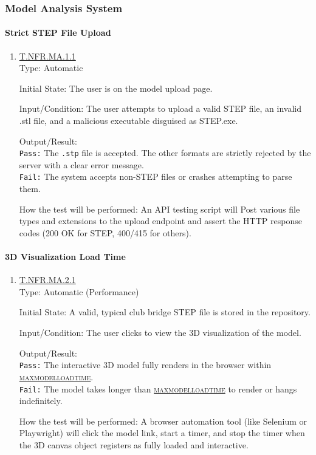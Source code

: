 \documentclass[12pt, titlepage]{article}
\newcommand{\testdef}[1]{\leavevmode\hypertarget{test:#1}{}\hyperlink{trace:#1}{#1}}
\DeclareRobustCommand{\cname}[1]{{\renewcommand{\_}{\textunderscore\allowbreak}\textsc{#1}}}
\newcommand{\constfirst}[1]{\leavevmode\hypertarget{constfirst:\detokenize{#1}}{}\hyperlink{const:\detokenize{#1}}{\cname{#1}}}
\newcommand{\const}[1]{\hyperlink{const:\detokenize{#1}}{\cname{#1}}}
\begin{document}
\subsubsection{Model Analysis System}

\paragraph{Strict STEP File Upload}
\begin{enumerate}
  \item \testdef{T.NFR.MA.1.1}\\
  Type: Automatic

  Initial State: The user is on the model upload page.

  Input/Condition: The user attempts to upload a valid STEP file, an invalid .stl file, and a malicious executable disguised as STEP.exe.

  Output/Result: \\
  \texttt{Pass:} The \texttt{.stp} file is accepted. The other formats are strictly rejected by the server with a clear error message.\\
  \texttt{Fail:} The system accepts non-STEP files or crashes attempting to parse them.

  How the test will be performed: An API testing script will Post various file types and extensions to the upload endpoint and assert the HTTP response codes (200 OK for STEP, 400/415 for others).
\end{enumerate}

\paragraph{3D Visualization Load Time}
\begin{enumerate}
  \item \testdef{T.NFR.MA.2.1}\\
  Type: Automatic (Performance)

  Initial State: A valid, typical club bridge STEP file is stored in the repository.

  Input/Condition: The user clicks to view the 3D visualization of the model. 

  Output/Result: \\
  \texttt{Pass:} The interactive 3D model fully renders in the browser within \constfirst{max\_model\_load\_time}.\\
  \texttt{Fail:} The model takes longer than \const{max\_model\_load\_time} to render or hangs indefinitely.

  How the test will be performed: A browser automation tool (like Selenium or Playwright) will click the model link, start a timer, and stop the timer when the 3D canvas object registers as fully loaded and interactive.
\end{enumerate}
\end{document}
